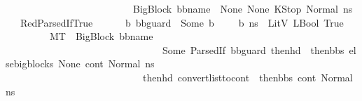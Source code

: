 \begin{isabellebody}
\ \ \ \ \ \ \ \ \ \ \ \ \ \ \ \ \ \ \ \ \ \ \ \ \ \ {\isacharparenleft}{\kern0pt}{\isacharparenleft}{\kern0pt}BigBlock\ bb{\isacharunderscore}{\kern0pt}name\ {\isacharbrackleft}{\kern0pt}{\isacharbrackright}{\kern0pt}\ None\ None{\isacharparenright}{\kern0pt}{\isacharcomma}{\kern0pt}\ KStop{\isacharcomma}{\kern0pt}\ Normal\ n{\isacharunderscore}{\kern0pt}s{\isacharparenright}{\kern0pt}{\isachardoublequoteclose}\isanewline
\isanewline
\ \ {\isacharbar}{\kern0pt}\ RedParsedIfTrue{\isacharcolon}{\kern0pt}\ \isanewline
\ \ \ \ {\isachardoublequoteopen}{\isasymlbrakk}{\isasymAnd}\ b{\isachardot}{\kern0pt}\ bb{\isacharunderscore}{\kern0pt}guard\ {\isacharequal}{\kern0pt}\ {\isacharparenleft}{\kern0pt}Some\ b{\isacharparenright}{\kern0pt}\ {\isasymLongrightarrow}\ \ {\isasymLambda}{\isacharcomma}{\kern0pt}{\isasymGamma}{\isacharcomma}{\kern0pt}{\isasymOmega}\ {\isasymturnstile}\ {\isasymlangle}b{\isacharcomma}{\kern0pt}\ n{\isacharunderscore}{\kern0pt}s{\isasymrangle}\ {\isasymDown}\ LitV\ {\isacharparenleft}{\kern0pt}LBool\ True{\isacharparenright}{\kern0pt}\ {\isasymrbrakk}\ \ \isanewline
\ \ \ \ \ \ \ \ {\isasymLongrightarrow}\ M{\isacharcomma}{\kern0pt}{\isasymLambda}{\isacharcomma}{\kern0pt}{\isasymGamma}{\isacharcomma}{\kern0pt}{\isasymOmega}{\isacharcomma}{\kern0pt}T\ {\isasymturnstile}\ {\isasymlangle}{\isacharparenleft}{\kern0pt}{\isacharparenleft}{\kern0pt}BigBlock\ bb{\isacharunderscore}{\kern0pt}name\ {\isacharbrackleft}{\kern0pt}{\isacharbrackright}{\kern0pt}\ \isanewline
\ \ \ \ \ \ \ \ \ \ \ \ \ \ \ \ \ \ \ \ \ \ \ \ \ \ \ \ \ \ \ \ {\isacharparenleft}{\kern0pt}Some\ {\isacharparenleft}{\kern0pt}ParsedIf\ bb{\isacharunderscore}{\kern0pt}guard\ {\isacharparenleft}{\kern0pt}then{\isacharunderscore}{\kern0pt}hd\ {\isacharhash}{\kern0pt}\ then{\isacharunderscore}{\kern0pt}bbs{\isacharparenright}{\kern0pt}\ elsebigblocks{\isacharparenright}{\kern0pt}{\isacharparenright}{\kern0pt}\ None{\isacharparenright}{\kern0pt}{\isacharcomma}{\kern0pt}\ cont{}{\isacharcomma}{\kern0pt}\ Normal\ n{\isacharunderscore}{\kern0pt}s{\isacharparenright}{\kern0pt}{\isasymrangle}\ {\isasymlongrightarrow}\ \isanewline
\ \ \ \ \ \ \ \ \ \ \ \ \ \ \ \ \ \ \ \ \ \ \ \ \ \ \ \ {\isacharparenleft}{\kern0pt}then{\isacharunderscore}{\kern0pt}hd{\isacharcomma}{\kern0pt}\ {\isacharparenleft}{\kern0pt}convert{\isacharunderscore}{\kern0pt}list{\isacharunderscore}{\kern0pt}to{\isacharunderscore}{\kern0pt}cont\ {\isacharparenleft}{\kern0pt}\ then{\isacharunderscore}{\kern0pt}bbs{\isacharparenright}{\kern0pt}\ cont{}{\isacharparenright}{\kern0pt}{\isacharcomma}{\kern0pt}\ Normal\ n{\isacharunderscore}{\kern0pt}s{\isacharparenright}{\kern0pt}{\isachardoublequoteclose}\isanewline

\end{isabellebody}
